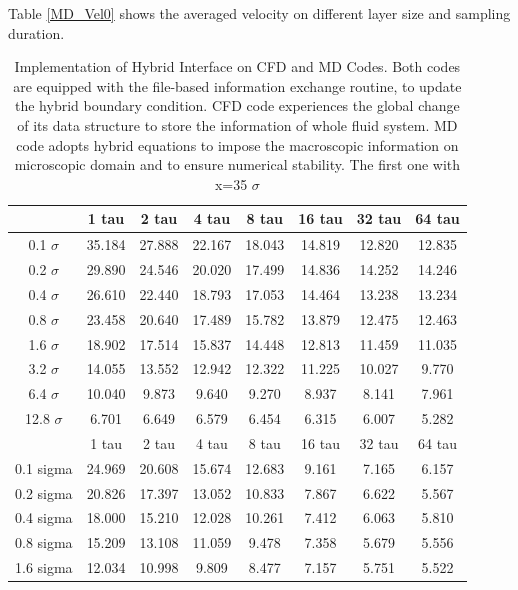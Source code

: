 \documentclass[conference,final]{IEEEtran}
\begin{document}
Table \ref{MD_Vel0} shows the averaged velocity on different layer size and sampling duration.


\begin{table}[t]
  \caption{\small Implementation of Hybrid Interface on CFD and MD Codes. Both codes are equipped with the file-based information exchange routine, to update the hybrid boundary condition. CFD code experiences the global change of its data structure to store the information of whole fluid system. MD code adopts hybrid equations to impose the macroscopic information on microscopic domain and to ensure numerical stability. The first one with x=35 $\sigma$}
  \label{table:MD_Vel0}
  \centering
  \begin{tabular}{c || c c c c c c c}
\hline
	&	1 tau	&	2 tau	&	4 tau	&	8 tau	&	16 tau	&	32 tau	&	64 tau	\\
\hline
0.1 $\sigma$ &	35.184 	&	27.888 	&	22.167 	&	18.043 	&	14.819 	&	12.820 	&	12.835 	\\
0.2 $\sigma$ &	29.890 	&	24.546 	&	20.020 	&	17.499 	&	14.836 	&	14.252 	&	14.246 	\\
0.4 $\sigma$ &	26.610 	&	22.440 	&	18.793 	&	17.053 	&	14.464 	&	13.238 	&	13.234 	\\
0.8 $\sigma$	&	23.458 	&	20.640 	&	17.489 	&	15.782 	&	13.879 	&	12.475 	&	12.463 	\\
1.6 $\sigma$ &	18.902 	&	17.514 	&	15.837 	&	14.448 	&	12.813 	&	11.459 	&	11.035 	\\
3.2 $\sigma$	&	14.055 	&	13.552 	&	12.942 	&	12.322 	&	11.225 	&	10.027 	&	9.770 	\\
6.4 $\sigma$	&	10.040 	&	9.873 	&	9.640 	&	9.270 	&	8.937 	&	8.141 	&	7.961 	\\
12.8 $\sigma$	&	6.701 	&	6.649 	&	6.579 	&	6.454 	&	6.315 	&	6.007 	&	5.282 	\\
\hline
\hline
	&	1 tau	&	2 tau	&	4 tau	&	8 tau	&	16 tau	&	32 tau	&	64 tau	\\
\hline
0.1 sigma	&	24.969 	&	20.608 	&	15.674 	&	12.683 	&	9.161 	&	7.165 	&	6.157 	\\
0.2 sigma	&	20.826 	&	17.397 	&	13.052 	&	10.833 	&	7.867 	&	6.622 	&	5.567 	\\
0.4 sigma	&	18.000 	&	15.210 	&	12.028 	&	10.261 	&	7.412 	&	6.063 	&	5.810 	\\
0.8 sigma	&	15.209 	&	13.108 	&	11.059 	&	9.478 	&	7.358 	&	5.679 	&	5.556 	\\
1.6 sigma	&	12.034 	&	10.998 	&	9.809 	&	8.477 	&	7.157 	&	5.751 	&	5.522 	\\

\end{tabular}
\end{table}
\end{document}
